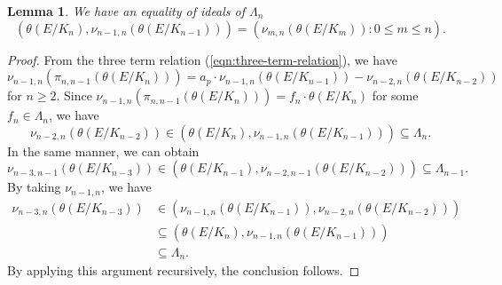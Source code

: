 \documentclass[10pt,a4paper]{amsart}
\newtheorem{lem}{Lemma}
\begin{document}
\begin{lem} \label{lem:reduction-generators}
We have an equality of ideals of $\Lambda_n$
$$\left( \theta(E/K_n) , \nu_{n-1, n} \left( \theta(E/K_{n-1}) \right) \right) = \left( \nu_{m, n} \left( \theta(E/K_{m}) \right) : 0 \leq m \leq n \right) .$$
\end{lem}

\begin{proof}
From the three term relation (\ref{eqn:three-term-relation}), we have
$$\nu_{n-1, n} \left( \pi_{n, n-1} \left( \theta(E/K_{n}) \right) \right) = a_p \cdot \nu_{n-1, n}  \left( \theta(E/K_{n-1}) \right) - \nu_{n-2, n} \left( \theta(E/K_{n-2}) \right) $$
for $n \geq 2$.
Since 
$\nu_{n-1, n} \left( \pi_{n, n-1} \left( \theta(E/K_{n}) \right) \right) = f_n \cdot \theta(E/K_{n})$
for some $f_n \in \Lambda_n$, we have
$$\nu_{n-2, n} \left( \theta(E/K_{n-2}) \right) \in \left( \theta(E/K_n) , \nu_{n-1, n} \left( \theta(E/K_{n-1}) \right) \right) \subseteq \Lambda_n.$$
In the same manner, we can obtain
$$\nu_{n-3, n-1} \left( \theta(E/K_{n-3}) \right) \in \left( \theta(E/K_{n-1}) , \nu_{n-2, n-1} \left( \theta(E/K_{n-2}) \right) \right) \subseteq \Lambda_{n-1}. $$
By taking $\nu_{n-1, n}$, we have
\begin{align*}
\nu_{n-3, n} \left( \theta(E/K_{n-3}) \right) & \in \left( \nu_{n-1, n} \left( \theta(E/K_{n-1}) \right) , \nu_{n-2, n} \left( \theta(E/K_{n-2}) \right) \right) \\
& \subseteq \left( \theta(E/K_{n}), \nu_{n-1, n} \left( \theta(E/K_{n-1}) \right)  \right) \\
& \subseteq \Lambda_{n}. 
\end{align*}
By applying this argument recursively, the conclusion follows.
\end{proof}
\end{document}
